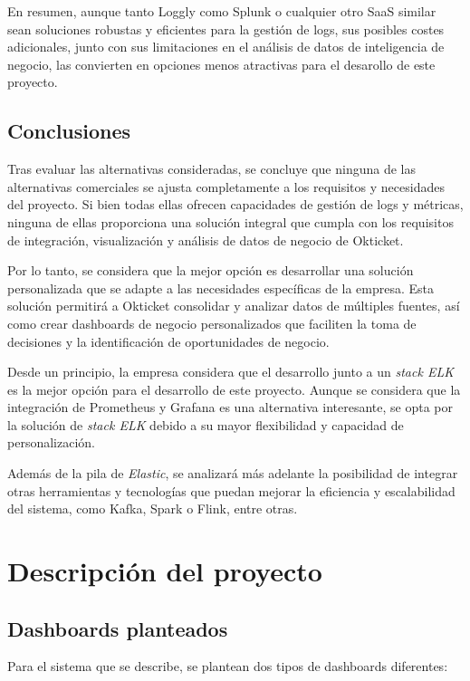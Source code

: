 \newpage{}
En resumen, aunque tanto Loggly como Splunk o cualquier otro SaaS similar
sean soluciones robustas y eficientes para la gestión de logs, sus posibles
costes adicionales, junto con sus limitaciones en el análisis de datos de
inteligencia de negocio, las convierten en opciones menos atractivas para el
desarollo de este proyecto.


\subsection{Conclusiones}
Tras evaluar las alternativas consideradas, se concluye que ninguna de las
alternativas comerciales se ajusta completamente a los requisitos y necesidades
del proyecto. Si bien todas ellas ofrecen capacidades de gestión de logs y
métricas, ninguna de ellas proporciona una solución integral que cumpla con los
requisitos de integración, visualización y análisis de datos de negocio de
Okticket.

Por lo tanto, se considera que la mejor opción es desarrollar una solución
personalizada que se adapte a las necesidades específicas de la empresa. Esta
solución permitirá a Okticket consolidar y analizar datos de múltiples fuentes,
así como crear dashboards de negocio personalizados que faciliten la toma de
decisiones y la identificación de oportunidades de negocio.

Desde un principio, la empresa considera que el desarrollo junto a un
\textit{stack ELK} es la mejor opción para el desarrollo de este proyecto.
Aunque se considera que la integración de Prometheus y Grafana es una
alternativa interesante, se opta por la solución de \textit{stack ELK} debido a
su mayor flexibilidad y capacidad de personalización.

Además de la pila de \textit{Elastic}, se analizará más adelante la posibilidad
de integrar otras herramientas y tecnologías que puedan mejorar la eficiencia y
escalabilidad del sistema, como Kafka, Spark o Flink, entre otras.


\newpage{}
\section{Descripción del proyecto}\label{sec:descripcion}
\subsection{Dashboards planteados}
Para el sistema que se describe, se plantean dos tipos de dashboards diferentes:

